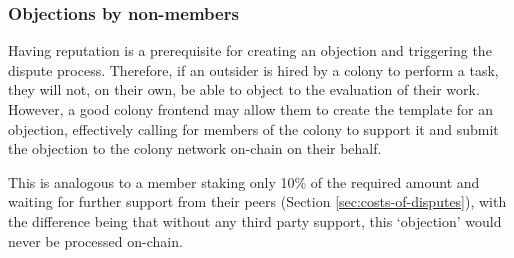 \subsubsection{Objections by non-members}

Having reputation is a prerequisite for creating an objection and triggering the dispute process. Therefore, if an outsider is hired by a colony to perform a task, they will not, on their own, be able to object to the evaluation of their work. However, a good colony frontend may allow them to create the template for an objection, effectively calling for members of the colony to support it and submit the objection to the colony network on-chain on their behalf.

This is analogous to a member staking only 10\% of the required amount and waiting for further support from their peers (Section \ref{sec:costs-of-disputes}), with the difference being that without any third party support, this `objection' would never be processed on-chain.
